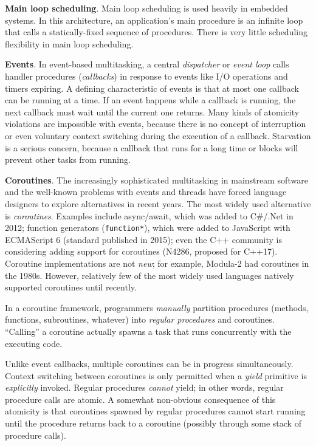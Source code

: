 \documentclass[9pt,preprint]{sigplanconf}
\begin{document}
\textbf{Main loop scheduling}.
Main loop scheduling is used heavily in embedded systems.
In this architecture, an application's main procedure is an infinite loop that calls a statically-fixed sequence of procedures.
There is very little scheduling flexibility in main loop scheduling.

\textbf{Events}.
In event-based multitasking, a central \emph{dispatcher} or \emph{event loop} calls handler procedures (\emph{callbacks}) in response to events like I/O operations and timers expiring.
A defining characteristic of events is that at most one callback can be running at a time.
If an event happens while a callback is running, the next callback must wait until the current one returns.
Many kinds of atomicity violations are impossible with events, because there is no concept of interruption or even voluntary context switching during the execution of a callback.
Starvation is a serious concern, because a callback that runs for a long time or blocks will prevent other tasks from running.

\textbf{Coroutines}.
The increasingly sophisticated multitasking in mainstream software and the well-known problems with events and threads have forced language designers to explore alternatives in recent years.
The most widely used alternative is \emph{coroutines}\footnotemark{}.
Examples include async/await, which was added to C\#/.Net in 2012; function generators (\texttt{function*}), which were added to JavaScript with ECMAScript 6 (standard published in 2015); even the C++ community is considering adding support for coroutines (N4286, proposed for C++17).
Coroutine implementations are not \emph{new}; for example, Modula-2 had coroutines in the 1980s.
However, relatively few of the most widely used languages natively supported coroutines until recently.


In a coroutine framework, programmers \emph{manually} partition procedures (methods, functions, subroutines, whatever) into \emph{regular procedures} and coroutines.
``Calling'' a coroutine actually spawns a task that runs concurrently with the executing code.

Unlike event callbacks, multiple coroutines can be in progress simultaneously.
Context switching between coroutines is only permitted when a \emph{yield} primitive is \emph{explicitly} invoked.
Regular procedures \emph{cannot} yield; in other words, regular procedure calls are atomic.
A somewhat non-obvious consequence of this atomicity is that coroutines spawned by regular procedures cannot start running until the procedure returns back to a coroutine (possibly through some stack of procedure calls).
\end{document}
